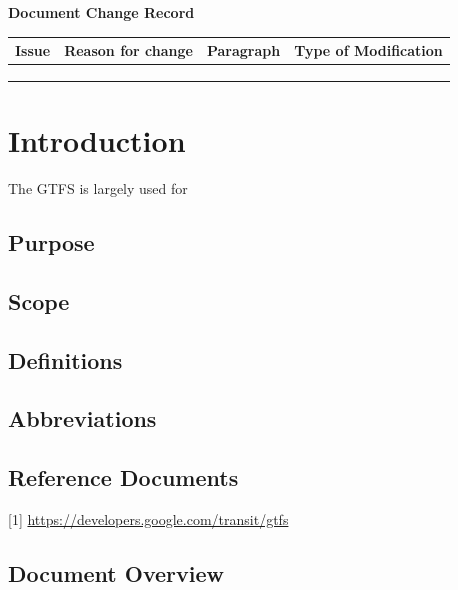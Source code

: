 \documentclass[12pt, a4paper]{book}
\newcommand*{\thead}[1]{\multicolumn{1}{|c|}{\bfseries #1}}
\begin{document}
\begin{center}
\textbf{{\large Document Change Record}}
\end{center}


\begin{table}[h]
\centering
	\begin{tabular}{|l|l|c|c|}
	\hline
	\thead{ Issue } & \thead{ Reason for change } & \thead{ Paragraph } & \thead{ Type of Modification } \\
	\hline	
	& & & \\
	\hline
	& & & \\
	\hline
	& & & \\
	\hline
	\end{tabular}	 	
\end{table}




\newpage
\section{Introduction}

The GTFS is largely used for 

\subsection{Purpose}
\subsection{Scope}

\subsection{Definitions}
\subsection{Abbreviations}
\subsection{Reference Documents}
{\small [1] \url{https://developers.google.com/transit/gtfs}}

\newpage
\subsection{Document Overview}
\end{document}
